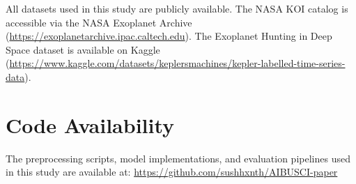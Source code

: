 \documentclass[preprint,11pt,times]{elsarticle}
\begin{document}
All datasets used in this study are publicly available. The NASA KOI catalog is accessible via the NASA Exoplanet Archive (\url{https://exoplanetarchive.ipac.caltech.edu}). The Exoplanet Hunting in Deep Space dataset is available on Kaggle (\url{https://www.kaggle.com/datasets/keplersmachines/kepler-labelled-time-series-data}).

\section*{Code Availability}

The preprocessing scripts, model implementations, and evaluation pipelines used in this study are available at: \url{https://github.com/sushhxnth/AIBUSCI-paper}

\end{document}
